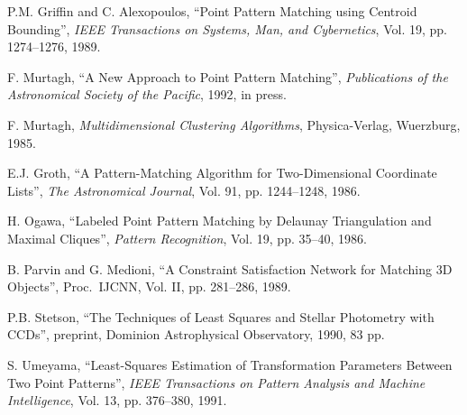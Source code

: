 \begin{thebibliography}{9}

P.M. Griffin and C. Alexopoulos, ``Point Pattern Matching using
Centroid Bounding'', {\em IEEE Transactions on Systems, Man, and Cybernetics},
Vol. 19, pp. 1274--1276, 1989.


F. Murtagh, ``A New Approach to Point Pattern Matching'', 
{\em Publications of the Astronomical Society of the Pacific},
1992, in press.

F. Murtagh, {\em Multidimensional Clustering Algorithms}, Physica-Verlag,
Wuerzburg, 1985.

E.J. Groth, ``A Pattern-Matching Algorithm for Two-Dimensional
Coordinate Lists'', {\em The Astronomical Journal}, Vol. 91, pp. 1244--1248,
1986.

H. Ogawa, ``Labeled Point Pattern Matching by Delaunay Triangulation
and Maximal Cliques'', {\em Pattern Recognition}, Vol. 19, pp. 35--40, 1986.

B. Parvin and G. Medioni, ``A Constraint Satisfaction Network for
Matching 3D Objects'', Proc.\ IJCNN, Vol. II, pp. 281--286, 1989.

P.B. Stetson, ``The Techniques of Least Squares and Stellar 
Photometry with CCDs'', preprint, Dominion Astrophysical Observatory,
1990, 83 pp.

S. Umeyama, ``Least-Squares Estimation of Transformation Parameters
Between Two Point Patterns'', {\em IEEE Transactions on Pattern Analysis
and Machine Intelligence}, Vol. 13, pp. 376--380, 1991.


\end{thebibliography}


